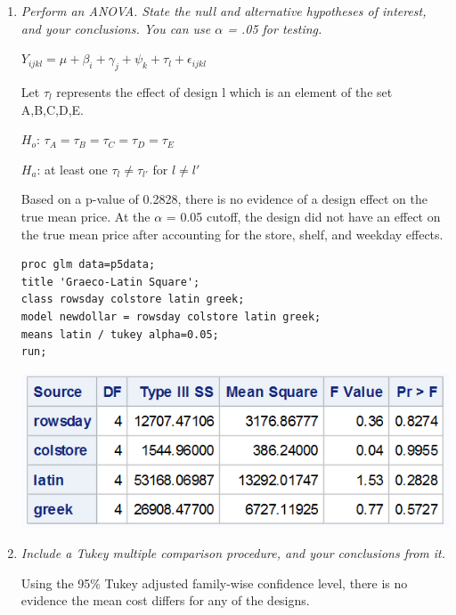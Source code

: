 \documentclass{article}\usepackage[]{graphicx}\usepackage[]{color}
\begin{document}
\begin{enumerate}
\begin{enumerate}
\item
{\it Perform an ANOVA. State the null and alternative hypotheses of interest, and your conclusions.
You can use $\alpha$ = .05 for testing.}

$Y_{ijkl} = \mu + \beta_{i} + \gamma_{j} + \psi_{k} + \tau_{l} + \epsilon_{ijkl}$

Let $\tau_{l}$ represents the effect of design l which is an element of the set A,B,C,D,E.

$H_{o}$: $\tau_{A} = \tau_{B} = \tau_{C} = \tau_{D} = \tau_{E}$

$H_{a}$: at least one $\tau_{l} \neq \tau_{l'}$ for $l \neq l'$

Based on a p-value of 0.2828, there is no evidence of a design effect on the true mean price. At the $\alpha$ =  0.05 cutoff, the design did not have an effect on the true mean price after accounting for the store, shelf, and weekday effects.

\begin{verbatim}
proc glm data=p5data; 
title 'Graeco-Latin Square';
class rowsday colstore latin greek;
model newdollar = rowsday colstore latin greek;
means latin / tukey alpha=0.05;
run;
\end{verbatim}

\includegraphics{latin}


\item
{\it  Include a Tukey multiple comparison procedure, and your conclusions from it.}

Using the 95\% Tukey adjusted family-wise confidence level, there is no evidence the mean cost differs for any of the designs.


\end{enumerate}
\end{enumerate}
\end{document}
